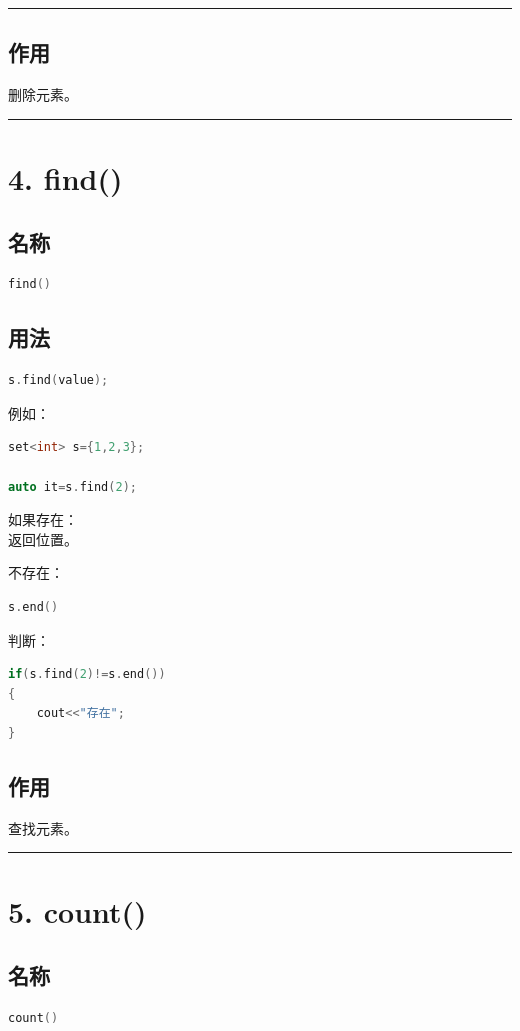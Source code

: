 \documentclass[9pt,twocolumn]{extarticle}
\begin{document}
\noindent\rule{\linewidth}{0.4pt}

\subsection{作用}
删除元素。

\noindent\rule{\linewidth}{0.4pt}

\section{4. find()}

\subsection{名称}
\begin{lstlisting}[language=C++]
find()
\end{lstlisting}

\subsection{用法}
\begin{lstlisting}[language=C++]
s.find(value);
\end{lstlisting}
例如：
\begin{lstlisting}[language=C++]
set<int> s={1,2,3};

auto it=s.find(2);
\end{lstlisting}
如果存在：\\
返回位置。

不存在：
\begin{lstlisting}[language=C++]
s.end()
\end{lstlisting}
判断：
\begin{lstlisting}[language=C++]
if(s.find(2)!=s.end())
{
    cout<<"存在";
}
\end{lstlisting}

\subsection{作用}
查找元素。

\noindent\rule{\linewidth}{0.4pt}

\section{5. count()}

\subsection{名称}
\begin{lstlisting}[language=C++]
count()
\end{lstlisting}
\end{document}
